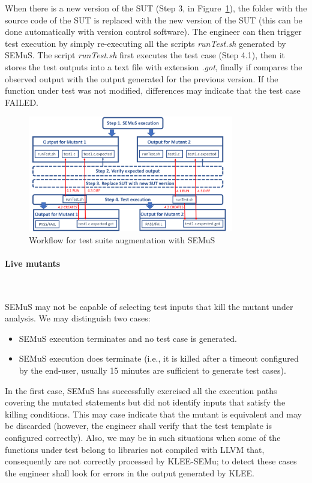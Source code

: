When there is a new version of the SUT (Step 3, in Figure~\ref{fig:semus:test:example}), the folder with the source code of the SUT is replaced with the new version of the SUT (this can be done automatically with version control software).
The engineer can then trigger test execution by simply re-executing all the scripts \emph{runTest.sh} generated by SEMuS.
The script \emph{runTest.sh} first executes the test case (Step 4.1), then it stores the test outputs into a text file with extension \emph{.got}, finally if compares the observed output with the output generated for the previous version. If the function under test was not modified, differences may indicate that the test case FAILED.

\begin{figure}[h]
\begin{center}
\includegraphics[width=0.8\textwidth]{images/semus-out}
\caption{Workflow for test suite augmentation with SEMuS}
\label{fig:semus:test:example}
\end{center}
\end{figure}

\paragraph{Live mutants}\

SEMuS may not be capable of selecting test inputs that kill the mutant under analysis. We may distinguish two cases:
\begin{itemize}
\item SEMuS execution terminates and no test case is generated.
\item SEMuS execution does terminate (i.e., it is killed after a timeout configured by the end-user, usually 15 minutes are sufficient to generate test cases).
\end{itemize}

In the first case, SEMuS has successfully exercised all the execution paths covering the mutated statements but did not identify inputs that satisfy the killing conditions. This may case indicate that the mutant is equivalent and may be discarded (however, the engineer shall verify that the test template is configured correctly). Also, we may be in such situations when some of the functions under test belong to libraries not compiled with LLVM that, consequently are not correctly processed by KLEE-SEMu; to detect these cases the engineer shall look for errors in the output generated by KLEE.

